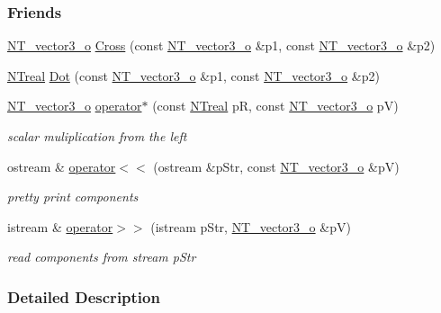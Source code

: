 \subsubsection*{Friends}
\begin{DoxyCompactItemize}
\item 
\hyperlink{class_n_t__vector3__o}{NT\_\-vector3\_\-o} \hyperlink{class_n_t__vector3__o_a4ec2f9d8e219e96f9884dda0af446b9f}{Cross} (const \hyperlink{class_n_t__vector3__o}{NT\_\-vector3\_\-o} \&p1, const \hyperlink{class_n_t__vector3__o}{NT\_\-vector3\_\-o} \&p2)
\item 
\hyperlink{nt__types_8h_a814a97893e9deb1eedcc7604529ba80d}{NTreal} \hyperlink{class_n_t__vector3__o_ae369446386ebb146cd15d670adb92e65}{Dot} (const \hyperlink{class_n_t__vector3__o}{NT\_\-vector3\_\-o} \&p1, const \hyperlink{class_n_t__vector3__o}{NT\_\-vector3\_\-o} \&p2)
\item 
\hyperlink{class_n_t__vector3__o}{NT\_\-vector3\_\-o} \hyperlink{class_n_t__vector3__o_aaffdbd4b8a826b82b540b82d13490f21}{operator$\ast$} (const \hyperlink{nt__types_8h_a814a97893e9deb1eedcc7604529ba80d}{NTreal} pR, const \hyperlink{class_n_t__vector3__o}{NT\_\-vector3\_\-o} pV)
\begin{DoxyCompactList}\small\item\em scalar muliplication from the left \item\end{DoxyCompactList}\item 
ostream \& \hyperlink{class_n_t__vector3__o_abc2fbbfdf5d9eb2335bd5fffaa400646}{operator$<$$<$} (ostream \&pStr, const \hyperlink{class_n_t__vector3__o}{NT\_\-vector3\_\-o} \&pV)
\begin{DoxyCompactList}\small\item\em pretty print components \item\end{DoxyCompactList}\item 
istream \& \hyperlink{class_n_t__vector3__o_a536a5ec6cb8786ad0a915acd0b66df4c}{operator$>$$>$} (istream pStr, \hyperlink{class_n_t__vector3__o}{NT\_\-vector3\_\-o} \&pV)
\begin{DoxyCompactList}\small\item\em read components from stream pStr \item\end{DoxyCompactList}\end{DoxyCompactItemize}


\subsubsection{Detailed Description}


